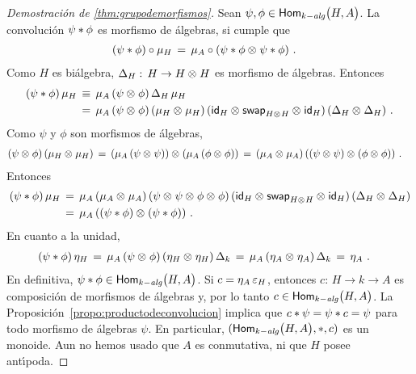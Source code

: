 \begin{proof}[Demostraci\'{o}n de \ref{thm:grupodemorfismos}]
	Sean $\psi,\phi\in\Homalg[k]\big(H,A\big)$. La convoluci\'{o}n
	$\psi\convol\phi$ es morfismo de \'{a}lgebras, si cumple que
	\begin{align*}
		(\psi\convol\phi)\circ\producto[H] & \,=\,
			\producto[A]\circ(\psi\convol\phi\tensor
				\psi\convol\phi)
		\text{ .}
	\end{align*}
	Como $H$ es bi\'{a}lgebra, $\coproducto[H]:\,H\rightarrow H\tensor H$
	es morfismo de \'{a}lgebras. Entonces
	\begin{align*}
		(\psi\convol\phi)\,\producto[H] & \,\equiv\,
			\producto[A]\,(\psi\tensor\phi)\,\coproducto[H]\,
				\producto[H] \\
		& \,=\, \producto[A]\,(\psi\tensor\phi)\,
				(\producto[H]\tensor\producto[H])\,
				(\id[H]\tensor\swap[H\tensor H]\tensor\id[H])\,
				(\coproducto[H]\tensor\coproducto[H])
		\text{ .}
	\end{align*}
	Como $\psi$ y $\phi$ son morfismos de \'{a}lgebras,
	\begin{align*}
		(\psi\tensor\phi)\,(\producto[H]\tensor\producto[H]) & \,=\,
			(\producto[A]\,(\psi\tensor\psi))\tensor
			(\producto[A]\,(\phi\tensor\phi)) \,=\,
			(\producto[A]\tensor\producto[A])\,
			((\psi\tensor\psi)\tensor(\phi\tensor\phi))
		\text{ .}
	\end{align*}
	Entonces
	\begin{align*}
		(\psi\convol\phi)\,\producto[H] & \,=\,\producto[A]\,
			(\producto[A]\tensor\producto[A])\,
			(\psi\tensor\psi\tensor\phi\tensor\phi)\,
			(\id[H]\tensor\swap[H\tensor H]\tensor\id[H])\,
			(\coproducto[H]\tensor\coproducto[H]) \\
		& \,=\,\producto[A]\,((\psi\convol\phi)\tensor
			(\psi\convol\phi))
		\text{ .}
	\end{align*}
	En cuanto a la unidad,
	\begin{align*}
		(\psi\convol\phi)\,\unidad[H] & \,=\,
			\producto[A]\,(\psi\tensor\phi)\,
			(\unidad[H]\tensor\unidad[H])\,\coproducto[k]
		\,=\,\producto[A]\,(\unidad[A]\tensor\unidad[A])\,
			\coproducto[k] \,=\,\unidad[A]
		\text{ .}
	\end{align*}
	En definitiva, $\psi\convol\phi\in\Homalg[k]\big(H,A\big)$. Si
	$c=\unidad[A]\,\counidad[H]$, entonces
	$c:\,H\rightarrow k\rightarrow A$ es composici\'{o}n de morfismos de
	\'{a}lgebras y, por lo tanto $c\in\Homalg[k]\big(H,A\big)$. La
	Proposici\'{o}n~\ref{propo:productodeconvolucion} implica que
	$c\convol\psi=\psi\convol c=\psi$ para todo morfismo de \'{a}lgebras
	$\psi$. En particular, $(\Homalg[k]\big(H,A\big),\convol,c)$ es un
	monoide. Aun no hemos usado que $A$ es conmutativa, ni que $H$ posee
	ant\'{\i}poda.


\end{proof}
